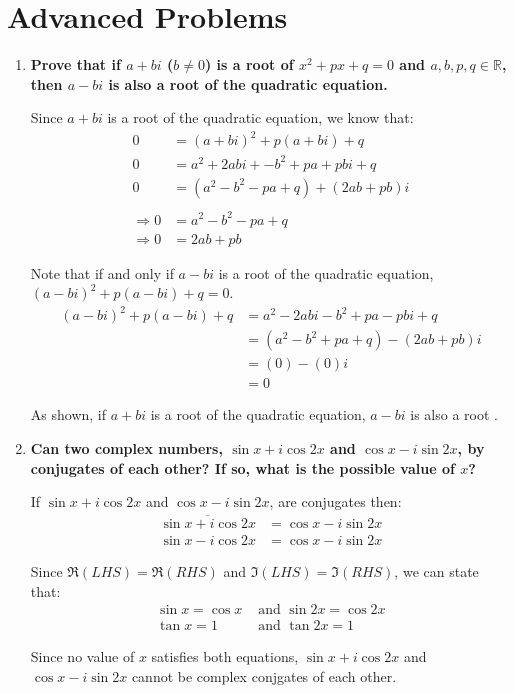 \documentclass[12pt]{article}
\begin{document}
\newpage

\section*{Advanced Problems}
\begin{enumerate}
    \item \textbf{Prove that if $a + bi$ ($b \neq 0$) is a root of $x^2 + px + q = 0$ and $a, b, p, q \in \mathbb{R}$, then $a - bi$ is also a root of the quadratic equation.}
    
    Since $a + bi$ is a root of the quadratic equation, we know that:
    \begin{align*}
        0 &= (a + bi)^2 + p(a + bi) + q \\
        0 &= a^2 + 2abi + -b^2 + pa + pbi + q \\
        0 &= (a^2 - b^2 - pa + q) + (2ab + pb)i \\ \\
        \Rightarrow 0 &= a^2 - b^2 - pa + q \\
        \Rightarrow 0 &= 2ab + pb
    \end{align*}
    
    Note that if and only if $a - bi$ is a root of the quadratic equation, $(a - bi)^2 + p(a - bi) + q = 0$.
    \begin{align*}
        (a - bi)^2 + p(a - bi) + q &= a^2 - 2abi - b^2 + pa - pbi + q \\
        &= (a^2 - b^2 + pa + q) -(2ab + pb)i \\
        &= (0) - (0)i \\
        &= 0
    \end{align*}
    
    As shown, if $a + bi$ is a root of the quadratic equation, $a - bi$ is also a root .
    
    \item \textbf{Can two complex numbers, $\sin{x} + i\cos{2x}$ and $\cos{x} - i\sin{2x}$, by conjugates of each other? If so, what is the possible value of $x$?}
    
    If $\sin x + i \cos 2x$ and $\cos x - i\sin 2x$, are conjugates then:
    \begin{align*}
        \overline{\sin x + i \cos 2x} &= \cos x - i\sin 2x \\
        \sin x - i \cos 2x &= \cos x - i\sin 2x
    \end{align*}
    
    Since $\Re{(\textit{LHS})} = \Re{(\textit{RHS})}$ and $\Im{(\textit{LHS})} = \Im{(\textit{RHS})}$, we can state that:
    \begin{align*}
        \sin x = \cos x &\text{ and } \sin 2x = \cos 2x \\
        \tan x = 1 &\text{ and } \tan 2x = 1
    \end{align*}
    
    Since no value of $x$ satisfies both equations, $\sin x + i \cos 2x$ and $\cos x - i\sin 2x$ cannot be complex conjgates of each other. 
    
\end{enumerate}
\end{document}
